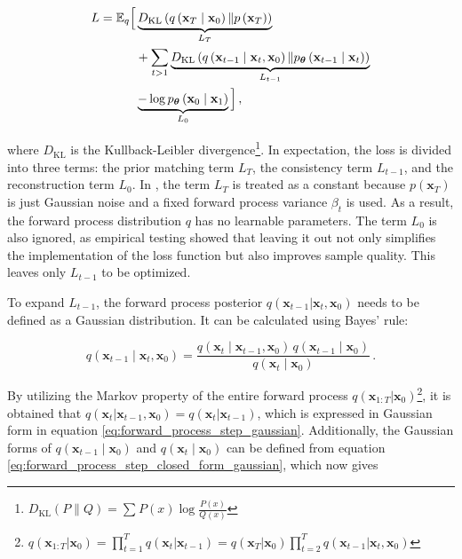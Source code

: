 \begin{align}
L = \mathbb{E}_q\Big[ 
    &\underbrace{D_{\mathrm{KL}}\left(q\left(\mathbf{x}_T \mid \mathbf{x}_0\right) \| p\left(\mathbf{x}_T\right)\right)}_{L_T} \notag \\
    &+ \sum_{t>1} \underbrace{D_{\mathrm{KL}}\left(q\left(\mathbf{x}_{t-1} \mid \mathbf{x}_t, \mathbf{x}_0\right) \| p_{\boldsymbol{\theta}}\left(\mathbf{x}_{t-1} \mid \mathbf{x}_t\right)\right)}_{L_{t-1}} \notag \\
    &\underbrace{-\log p_{\boldsymbol{\theta}}\left(\mathbf{x}_0 \mid \mathbf{x}_1\right)}_{L_0}
\Big] \,,
\label{eq:elbo_loss}
\end{align}

where $D_{\mathrm{KL}}$ is the Kullback-Leibler divergence\footnote{$D_{\mathrm{KL}}(P \| Q) = \sum_{} P(x) \log \frac{P(x)}{Q(x)}$}. In expectation, the loss is divided into three terms: the prior matching term $L_T$, the consistency term $L_{t-1}$, and the reconstruction term $L_0$. In \cite{ho2020denoisingdiffusionprobabilisticmodels}, the term $L_T$ is treated as a constant because $p(\mathbf{x}_T)$ is just Gaussian noise and a fixed forward process variance $\beta_t$ is used. As a result, the forward process distribution $q$ has no learnable parameters. The term $L_0$ is also ignored, as empirical testing showed that leaving it out not only simplifies the implementation of the loss function but also improves sample quality. This leaves only $L_{t-1}$ to be optimized.

To expand $L_{t-1}$, the forward process posterior $q(\mathbf{x}_{t-1}|\mathbf{x}_t,\mathbf{x}_0)$ needs to be defined as a Gaussian distribution. It can be calculated using Bayes' rule:

\begin{equation}
q(\mathbf{x}_{t-1} \mid \mathbf{x}_t, \mathbf{x}_0) = \frac{q(\mathbf{x}_t \mid \mathbf{x}_{t-1}, \mathbf{x}_0) \, q(\mathbf{x}_{t-1} \mid \mathbf{x}_0)}{q(\mathbf{x}_t \mid \mathbf{x}_0)} \,.
\label{eq:posterior_bayes}
\end{equation}

By utilizing the Markov property of the entire forward process $q(\mathbf{x}_{1:T}|\mathbf{x}_0)$\footnote{$q(\mathbf{x}_{1:T}|\mathbf{x}_0)= \prod_{t=1}^{T} q(\mathbf{x}_t|\mathbf{x}_{t-1}) = q(\mathbf{x}_T|\mathbf{x}_0) \prod_{t=2}^{T} q(\mathbf{x}_{t-1}|\mathbf{x}_t,\mathbf{x}_0)$}, it is obtained that $q(\mathbf{x}_t|\mathbf{x}_{t-1},\mathbf{x}_0) = q(\mathbf{x}_t|\mathbf{x}_{t-1})$, which is expressed in Gaussian form in equation \ref{eq:forward_process_step_gaussian}. Additionally, the Gaussian forms of $q(\mathbf{x}_{t-1} \mid \mathbf{x}_0)$ and $q(\mathbf{x}_t \mid \mathbf{x}_0)$ can be defined from equation \ref{eq:forward_process_step_closed_form_gaussian}, which now gives

